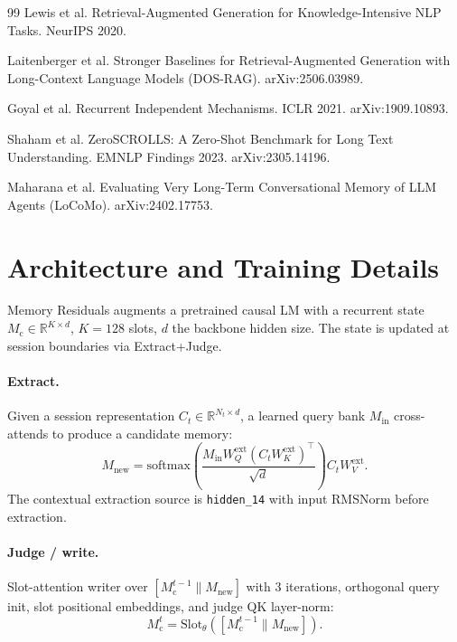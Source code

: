 \documentclass{article}
\newcommand{\Mc}{M_{\mathrm{c}}}
\newcommand{\Ct}{C_t}
\newcommand{\Min}{M_{\mathrm{in}}}
\newcommand{\Mnew}{M_{\mathrm{new}}}
\begin{document}
\begin{thebibliography}{99}
Lewis et al.
\newblock Retrieval-Augmented Generation for Knowledge-Intensive NLP Tasks.
\newblock NeurIPS 2020.

Laitenberger et al.
\newblock Stronger Baselines for Retrieval-Augmented Generation with Long-Context Language Models (DOS-RAG).
\newblock arXiv:2506.03989.

Goyal et al.
\newblock Recurrent Independent Mechanisms.
\newblock ICLR 2021. arXiv:1909.10893.

Shaham et al.
\newblock ZeroSCROLLS: A Zero-Shot Benchmark for Long Text Understanding.
\newblock EMNLP Findings 2023. arXiv:2305.14196.

Maharana et al.
\newblock Evaluating Very Long-Term Conversational Memory of LLM Agents (LoCoMo).
\newblock arXiv:2402.17753.

\end{thebibliography}

\appendix

\section{Architecture and Training Details}
\label{app:arch}

Memory Residuals augments a pretrained causal LM with a recurrent
state $\Mc \in \mathbb{R}^{K \times d}$, $K=128$ slots, $d$ the
backbone hidden size.  The state is updated at session boundaries
via Extract+Judge.

\paragraph{Extract.}  Given a session representation
$\Ct \in \mathbb{R}^{N_t \times d}$, a learned query bank $\Min$
cross-attends to produce a candidate memory:
\begin{equation}
\Mnew = \mathrm{softmax}\!\left(\frac{\Min W_Q^{\mathrm{ext}}(\Ct W_K^{\mathrm{ext}})^\top}{\sqrt d}\right)\Ct W_V^{\mathrm{ext}} .
\end{equation}
The contextual extraction source is \texttt{hidden\_14} with input
RMSNorm before extraction.

\paragraph{Judge / write.}  Slot-attention writer over $[\Mc^{t-1}\!\parallel\Mnew]$ with $3$ iterations, orthogonal query
init, slot positional embeddings, and judge QK layer-norm:
\begin{equation}
\Mc^t = \mathrm{Slot}_{\theta}\!\left([\Mc^{t-1} \parallel \Mnew]\right) .
\end{equation}
\end{document}
